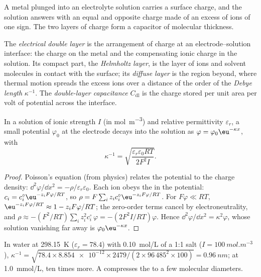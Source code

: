 A metal plunged into an electrolyte solution carries a surface charge, and the
solution answers with an equal and opposite charge made of an excess of ions
of one sign. The two layers of charge form a capacitor of molecular thickness.

\begin{definition}\label{def:b3:electrode-kinetics:double-layer}
The \emph{electrical double layer} is the
arrangement of charge at an electrode--solution interface: the charge on the
metal and the compensating ionic charge in the solution. Its compact part, the
\emph{Helmholtz layer}, is the layer of ions and solvent
molecules in contact with the surface; its \emph{diffuse layer} is the region beyond, where thermal motion spreads the excess ions over
a distance of the order of the \emph{Debye length} $\kappa^{-1}$. The
\emph{double-layer capacitance} $C_{\mathrm{dl}}$ is the charge
stored per unit area per volt of potential across the interface.
\end{definition}

\begin{proposition}\label{prop:b3:electrode-kinetics:debye-length}
In a solution of ionic strength $I$ (in \unit{mol.m^{-3}}) and relative permittivity
$\varepsilon_r$, a small potential $\varphi_0$ at the electrode decays into the solution as
$\varphi = \varphi_0\eu^{-\kappa x}$, with
\[
  \kappa^{-1} = \sqrt{\frac{\varepsilon_r\varepsilon_0RT}{2F^2I}} .
\]
\end{proposition}

\begin{proof}
Poisson's equation (from physics) relates the potential to the charge density:
$\dd^2\varphi/\dd x^2 = -\rho/\varepsilon_r\varepsilon_0$. Each ion obeys the  in the
potential: $c_i = c_i^{\circ}\eu^{-z_iF\varphi/RT}$, so $\rho = F\sum_iz_ic_i^{\circ}\eu^{-z_iF\varphi/RT}$. For $F\varphi \ll RT$,
$\eu^{-z_iF\varphi/RT} \approx 1 - z_iF\varphi/RT$; the zero-order terms cancel by electroneutrality,
and $\rho \approx -(F^2/RT)\sum_iz_i^2c_i^{\circ}\,\varphi = -(2F^2I/RT)\varphi$. Hence $\dd^2\varphi/\dd x^2 = \kappa^2\varphi$, whose
solution vanishing far away is $\varphi_0\eu^{-\kappa x}$.
\end{proof}

\begin{example}\label{ex:b3:electrode-kinetics:debye}
In water at \qty{298.15}{K} ($\varepsilon_r = 78.4$) with \qty{0.10}{mol/L} of a 1:1 salt ($I = \qty{100}{mol.m^{-3}}$),
$\kappa^{-1} = \sqrt{78.4 \times \num{8.854e-12} \times 2479/(2 \times 96\,485^2 \times 100)} = \qty{0.96}{nm}$; at \qty{1.0}{mmol/L},
ten times more. A  compresses the  to a few
molecular diameters.
\end{example}

